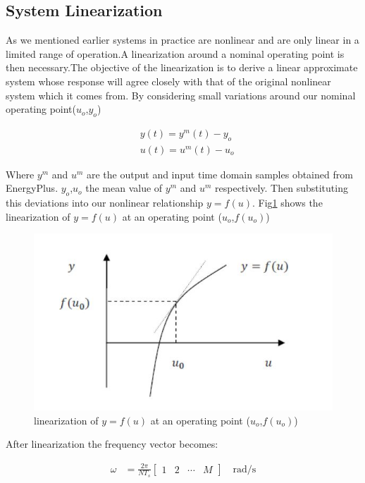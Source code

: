 \documentclass[a4paper,12pt]{article}
\numberwithin{equation}{section}
\begin{document}
\subsection{System Linearization}
As we mentioned earlier systems in practice are nonlinear and are only linear in a limited range of operation.A linearization around a nominal operating point is then necessary.The objective of the linearization  is to derive a linear approximate system whose response will agree closely with that of the original nonlinear system which it comes from. By considering small variations around our nominal operating point($u_{o}$,$y_{o}$)

\begin{equation}
\begin{aligned}
&y(t)=y^{m}(t)-y_{o} \\
&u(t)=u^{m}(t)-u_{o}
\end{aligned}
\end{equation}

\noindent
Where $y^{m}$ and $u^{m}$ are the output and input time domain samples obtained from EnergyPlus. $y_{o}$,$u_{o}$ the mean value of $y^{m}$ and $u^{m}$ respectively. Then substituting this deviations into our nonlinear relationship $y=f(u)$. Fig\ref{eq:linearization} shows the linearization of $y=f(u)$ at an operating point ($u_{o}$,$f(u_{o})$)

\begin{figure}[H]
    \includegraphics[scale=1]{linearization.JPG}
    \centering
    \caption{linearization of $y=f(u)$ at an operating point ($u_{o}$,$f(u_{o})$)}
    \label{eq:linearization}
\end{figure}

After linearization the frequency vector becomes:

\begin{equation}
\begin{aligned}
\omega &=\frac{2 \pi}{N T_{s}}\left[\begin{array}{lllll}
1 & 2 & \cdots & M
\end{array}\right] \quad \mathrm{rad} / \mathrm{s}
\end{aligned}
\end{equation}
\end{document}
